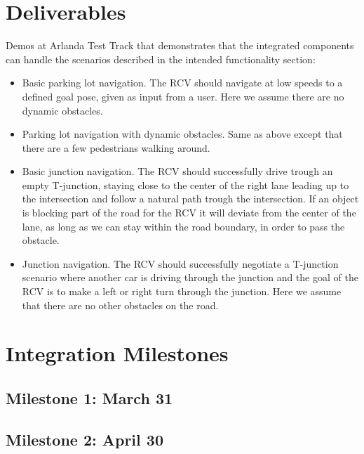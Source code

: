 \documentclass[11pt,a4paper]{article}
\begin{document}
\section{Deliverables}

Demos at Arlanda Test Track that demonstrates that the integrated
components can handle the scenarios described in the intended
functionality section:

\begin{itemize}

\item Basic parking lot navigation. The RCV should navigate at low speeds 
  to a defined goal pose, given as input from a user. Here we assume there
  are no dynamic obstacles.

\item Parking lot navigation with dynamic obstacles. Same as above except that 
  there are a few pedestrians walking around.

\item Basic junction navigation. The RCV should successfully drive
  trough an empty T-junction, staying close to the center of the right
  lane leading up to the intersection and follow a natural path trough the intersection.
  If an object is blocking part of the road for the RCV it will deviate from the center of the
  lane, as long as we can stay within the road boundary, in order to pass the obstacle.

\item Junction navigation. The RCV should successfully negotiate a
  T-junction scenario where another car is driving through the
  junction and the goal of the RCV is to make a left or right turn
  through the junction. Here we assume that there are no
  other obstacles on the road.

\end{itemize}

\section{Integration Milestones}

\subsection{Milestone 1: March 31}
\label{milestone1}

\subsection{Milestone 2: April 30}
\label{milestone2}
\end{document}

